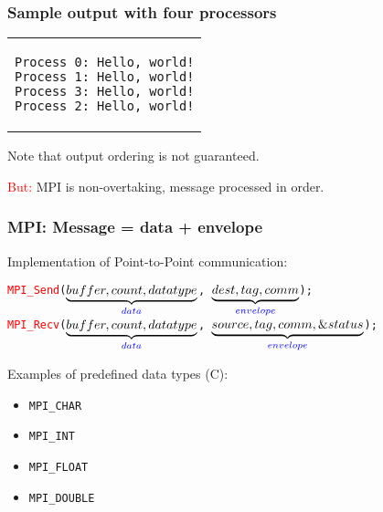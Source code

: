 \begin{frame}[fragile]
  \frametitle{Sample output with four processors}
  \begin{center}
    \begin{tabular}{c}
\begin{lstlisting}
Process 0: Hello, world!
Process 1: Hello, world!
Process 3: Hello, world!
Process 2: Hello, world!
\end{lstlisting}
    \end{tabular}
  \end{center}
  Note that output ordering is not guaranteed.

\medskip
\begin{center}
\textcolor{red}{But:} MPI is non-overtaking, message processed in order.
\end{center}
\end{frame}

\begin{frame}
  \frametitle{MPI: Message = data + envelope}

Implementation of Point-to-Point communication:

\medskip
  \texttt{\textcolor{red}{MPI\_Send}($\underbrace{buffer, count, datatype}_{\textcolor{blue}{data}}$,
    $\underbrace{dest, tag, comm}_{\textcolor{blue}{envelope}}$); } \\
  \texttt{\textcolor{red}{MPI\_Recv}($\underbrace{buffer, count, datatype}_{\textcolor{blue}{data}}$,
    $\underbrace{source, tag, comm,\&status}_{\textcolor{blue}{envelope}}$); }

  Examples of predefined data types (C):
  \begin{itemize}
  \item \texttt{MPI\_CHAR}
  \item \texttt{MPI\_INT}
  \item \texttt{MPI\_FLOAT}
  \item \texttt{MPI\_DOUBLE}
  \end{itemize}
\end{frame}

